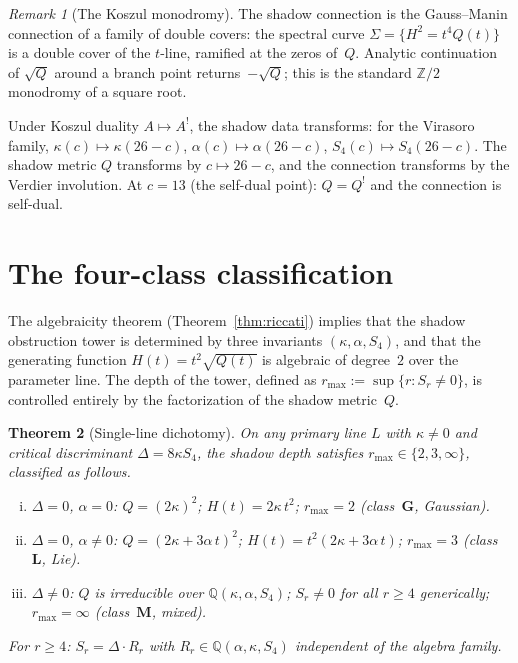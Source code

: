 \documentclass[11pt]{article}
\theoremstyle{plain}
\newtheorem{theorem}{Theorem}[section]
\theoremstyle{definition}
\theoremstyle{remark}
\newtheorem{remark}[theorem]{Remark}
\begin{document}
\begin{remark}[The Koszul monodromy]
\label{rem:koszul-monodromy}
The shadow connection is the Gauss--Manin connection of a
family of double covers: the spectral curve
$\Sigma = \{H^2 = t^4 Q(t)\}$ is a double cover of the
$t$-line, ramified at the zeros of~$Q$.
Analytic continuation of $\sqrt{Q}$ around a branch point
returns~$-\sqrt{Q}$; this is the standard $\mathbb{Z}/2$
monodromy of a square root.

Under Koszul duality $A \mapsto A^!$, the shadow data
transforms: for the Virasoro family,
$\kappa(c) \mapsto \kappa(26-c)$,
$\alpha(c) \mapsto \alpha(26-c)$,
$S_4(c) \mapsto S_4(26-c)$. The shadow metric
$Q$ transforms by $c \mapsto 26 - c$, and the
connection transforms by the Verdier involution.
At $c = 13$ (the self-dual point):
$Q = Q^!$ and the connection is self-dual.
\end{remark}

\section{The four-class classification}
\label{sec:classification}

The algebraicity theorem (Theorem~\ref{thm:riccati}) implies
that the shadow obstruction tower is determined by three invariants
$(\kappa, \alpha, S_4)$, and that the generating function
$H(t) = t^2\sqrt{Q(t)}$ is algebraic of degree~$2$ over
the parameter line. The depth of the tower, defined as
$r_{\max} := \sup\{r : S_r \neq 0\}$, is controlled entirely
by the factorization of the shadow metric~$Q$.

\begin{theorem}[Single-line dichotomy]
\label{thm:dichotomy}
On any primary line $L$ with $\kappa \neq 0$ and critical
discriminant $\Delta = 8\kappa S_4$, the shadow depth satisfies
$r_{\max} \in \{2, 3, \infty\}$, classified as follows.
\begin{enumerate}[(i)]
\item $\Delta = 0$, $\alpha = 0$:
 $Q = (2\kappa)^2$; $H(t) = 2\kappa\,t^2$;
 $r_{\max} = 2$ \textup{(class~$\mathbf{G}$, Gaussian)}.
\item $\Delta = 0$, $\alpha \neq 0$:
 $Q = (2\kappa + 3\alpha\,t)^2$;
 $H(t) = t^2(2\kappa + 3\alpha\,t)$;
 $r_{\max} = 3$ \textup{(class~$\mathbf{L}$, Lie)}.
\item $\Delta \neq 0$:
 $Q$ is irreducible over $\mathbb{Q}(\kappa, \alpha, S_4)$;
 $S_r \neq 0$ for all $r \geq 4$
 generically; $r_{\max} = \infty$ \textup{(class~$\mathbf{M}$, mixed)}.
\end{enumerate}
For $r \geq 4$: $S_r = \Delta \cdot R_r$ with
$R_r \in \mathbb{Q}(\alpha, \kappa, S_4)$ independent of the
algebra family.
\end{theorem}
\end{document}
